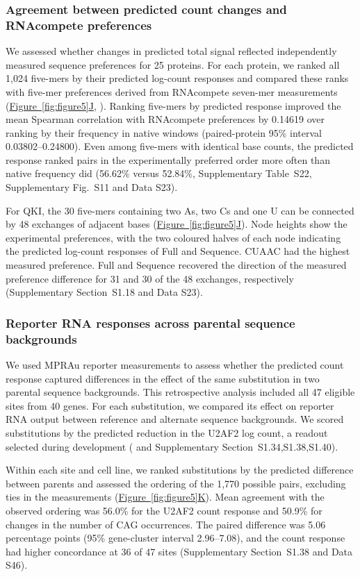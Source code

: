 \documentclass[webpdf,contemporary,large]{current_assets/oup-authoring-template}
\newcommand{\figpanelref}[2]{\hyperref[#1]{Figure~\ref*{#1}#2}}
\newcommand{\supfig}[1]{Supplementary Fig.~#1}
\newcommand{\suptab}[1]{Supplementary Table~#1}
\newcommand{\supsect}[1]{Supplementary Section~#1}
\begin{document}
\subsubsection{Agreement between predicted count changes and RNAcompete preferences}

We assessed whether changes in predicted total signal reflected independently measured sequence preferences for 25 proteins. For each protein, we ranked all 1,024 five-mers by their predicted log-count responses and compared these ranks with five-mer preferences derived from RNAcompete seven-mer measurements (\figpanelref{fig:figure5}{J}, \citealp{ray2013compendium}). Ranking five-mers by predicted response improved the mean Spearman correlation with RNAcompete preferences by 0.14619 over ranking by their frequency in native windows (paired-protein 95\% interval 0.03802--0.24800). Even among five-mers with identical base counts, the predicted response ranked pairs in the experimentally preferred order more often than native frequency did (56.62\% versus 52.84\%, \suptab{S22}, \supfig{S11} and Data S23).

For QKI, the 30 five-mers containing two As, two Cs and one U can be connected by 48 exchanges of adjacent bases (\figpanelref{fig:figure5}{J}). Node heights show the experimental preferences, with the two coloured halves of each node indicating the predicted log-count responses of Full and Sequence. CUAAC had the highest measured preference. Full and Sequence recovered the direction of the measured preference difference for 31 and 30 of the 48 exchanges, respectively (\supsect{S1.18} and Data S23).

\subsubsection{Reporter RNA responses across parental sequence backgrounds}

We used MPRAu reporter measurements to assess whether the predicted count response captured differences in the effect of the same substitution in two parental sequence backgrounds. This retrospective analysis included all 47 eligible sites from 40 genes. For each substitution, we compared its effect on reporter RNA output between reference and alternate sequence backgrounds. We scored substitutions by the predicted reduction in the U2AF2 log count, a readout selected during development (\citealp{griesemer2021mprau} and \supsect{S1.34,S1.38,S1.40}).

Within each site and cell line, we ranked substitutions by the predicted difference between parents and assessed the ordering of the 1,770 possible pairs, excluding ties in the measurements (\figpanelref{fig:figure5}{K}). Mean agreement with the observed ordering was 56.0\% for the U2AF2 count response and 50.9\% for changes in the number of CAG occurrences. The paired difference was 5.06 percentage points (95\% gene-cluster interval 2.96--7.08), and the count response had higher concordance at 36 of 47 sites (\supsect{S1.38} and Data S46).
\end{document}
